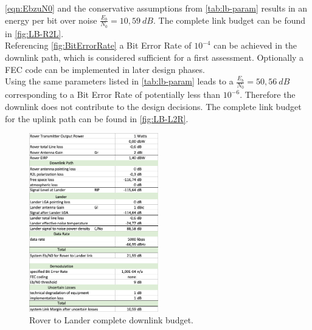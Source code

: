 \autoref{eqn:EbzuN0} and the conservative assumptions from \autoref{tab:lb-param} results in an energy per bit over noise $\frac{{E}_{b}}{{N}_{0}} = 10,59\ dB$. The complete link budget can be found in \autoref{fig:LB-R2L}. \\
Referencing \autoref{fig:BitErrorRate} a Bit Error Rate of $10^{-4}$ can be achieved in the downlink path, which is considered sufficient for a first assessment. Optionally a FEC code can be implemented in later design phases.\\

Using the same parameters listed in \autoref{tab:lb-param} leads to a $\frac{{E}_{b}}{{N}_{0}} = 50,56\ dB$ corresponding to a Bit Error Rate of potentially less than $10^{-6}$. Therefore the downlink does not contribute to the design decisions. The complete link budget for the uplink path can be found in \autoref{fig:LB-L2R}.

\begin{figure}[htb]
	\centering
  		\includegraphics[width=0.5\textwidth]{Media/LB-RovertoLander.png}
  \caption{Rover to Lander complete downlink budget.}
  \label{fig:LB-R2L}
\end{figure}


